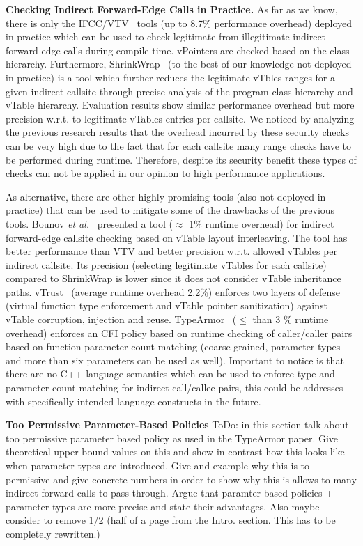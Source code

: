 \textbf{Checking Indirect Forward-Edge Calls in Practice.}
\label{C++ Indirect Calls in Practice}
As far as we know, there is only the IFCC/VTV~\cite{vtv:tice} tools (up to 8.7\% performance overhead) deployed in practice
which can be used to check legitimate from illegitimate indirect forward-edge calls during compile time.
vPointers are checked based on the class hierarchy. Furthermore, ShrinkWrap~\cite{haller:shrinkwrap} (to the best of our knowledge not deployed in practice)
is a tool which further reduces the legitimate vTbles ranges for a given indirect callsite
through precise analysis of the program class hierarchy and vTable hierarchy. 
Evaluation results show similar performance overhead but more precision w.r.t. to legitimate vTables entries per callsite.
We noticed by analyzing the previous research results that the overhead incurred by
these security checks can be very high due to the fact that for each callsite many range checks 
have to be performed during runtime. Therefore, despite its security benefit these types of
checks can not be applied in our opinion to high performance applications.

As alternative, there are other highly promising tools (also not deployed in practice) that can be used to mitigate 
some of the drawbacks of the previous tools. 
Bounov \textit{et al.}~\cite{bounov:interleaving} presented a tool ($\approx$ 1\% runtime overhead)
for indirect forward-edge callsite checking based on vTable layout interleaving. The tool has better performance
than VTV and better precision w.r.t. allowed vTables per indirect callsite. Its precision (selecting legitimate vTables for each callsite)
compared to ShrinkWrap is lower since it does not consider vTable inheritance paths.
vTrust~\cite{zhang:vtrust} (average runtime overhead 2.2\%) enforces two layers of defense (virtual function type enforcement and vTable pointer sanitization)
against vTable corruption, injection and reuse.
TypeArmor~\cite{veen:typearmor} ($\le$ than 3 \% runtime overhead) enforces an CFI policy based on runtime checking of caller/caller pairs based
on function parameter count matching (coarse grained, parameter types and more than six parameters can be used as well).
Important to notice is that there are no C++ language semantics which can be used to enforce type and 
parameter count matching for indirect call/callee pairs, this could be addresses with specifically intended language constructs in the future.

\textbf{Too Permissive Parameter-Based Policies}
\label{Too Permissive Parameter-Based Policies}
ToDo: in this section talk about too permissive parameter based policy as used in the TypeArmor paper. Give theoretical upper bound values
on this and show in contrast how this looks like when parameter types are introduced.
Give and example why this is to permissive and give concrete numbers in order to show why this is allows to many 
indirect forward calls to pass through. Argue that paramter based policies + parameter types are more precise and 
state their advantages. Also maybe consider to remove 1/2 (half of a page from the Intro. section. This has to be completely rewritten.)

